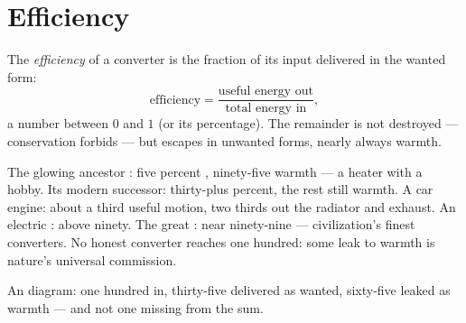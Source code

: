 \section{Efficiency}

\begin{definition}[Efficiency]\label{def:g9:energy-conversions:efficiency}
The \emph{efficiency} of a converter is the
fraction of its input  delivered in the wanted form:
\[
\text{efficiency} =
\frac{\text{useful energy out}}{\text{total energy in}},
\]
a number between $0$ and $1$ (or its percentage). The
remainder is not destroyed --- conservation forbids --- but
escapes in unwanted forms, nearly always warmth.
\end{definition}

\begin{example}\label{ex:g9:energy-conversions:reportcards}
The glowing ancestor : five percent , ninety-five
warmth --- a heater with a hobby. Its modern successor:
thirty-plus percent, the rest still warmth. A car engine:
about a third useful motion, two thirds out the radiator and
exhaust. An electric : above ninety. The great
: near ninety-nine --- civilization's finest
converters. No honest converter reaches one hundred: some
leak to warmth is nature's universal commission.
\end{example}

\begin{omfigure}

{\small An  diagram: one hundred  in,
thirty-five delivered as wanted, sixty-five leaked as warmth
--- and not one  missing from the sum.}
\end{omfigure}

